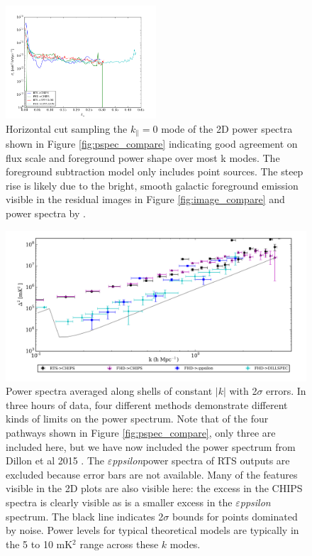 \documentclass[twolcolumn,iop]{emulateapj}
\def\eppsilon{{\it $\varepsilon$ppsilon}}
\def\dilloncite{Dillon et al 2015 }
\begin{document}
\begin{figure}[htbp]
\begin{center}
\includegraphics[width=0.5\textwidth]{figures/MWAPipeline_compare_1d_kperp}
\caption{Horizontal cut sampling the $k_\parallel = 0$ mode of the 2D power spectra shown in Figure \ref{fig:pspec_compare} indicating good agreement on flux scale and foreground power shape over most k modes. The foreground subtraction model only includes point sources. The steep rise is likely due to the bright, smooth galactic foreground emission visible in the residual images in Figure \ref{fig:image_compare} and power spectra by \cite{2015ApJ...807L..28T}.}
\label{fig:1d_kperp}
\end{center}
\end{figure}


\begin{figure}[htbp]

\includegraphics[width=\textwidth]{figures/MWA_PS_Compare/MWAPipeline_compare_1d_radial_logbryna.png}
\caption{Power spectra averaged along shells of constant $|k|$ with 2$\sigma$ errors. In three hours of data, four different methods demonstrate different kinds of limits on the power spectrum. Note that of the four pathways shown in Figure \ref{fig:pspec_compare}, only three are included here, but we have now included the power spectrum from \dilloncite{}. The \eppsilon power spectra of RTS outputs are excluded because error bars are not available. Many of the features visible in the 2D plots are also visible here: the excess in the CHIPS spectra is clearly visible as is a smaller excess in the \eppsilon{} spectrum.  The black line indicates 2$\sigma$ bounds for points dominated by noise.  Power levels for typical theoretical models are typically in the 5 to 10 mK$^2$ range across these $k$ modes.
\label{fig:1D_pspecs}}

\end{figure}
\end{document}
